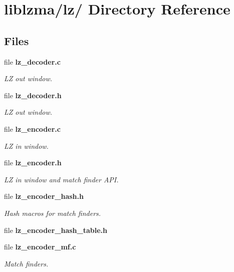 \section{liblzma/lz/ Directory Reference}
\label{dir_50b86e5c919915733207984a4aa1052b}
\subsection*{Files}
\begin{DoxyCompactItemize}
\item 
file {\bf lz\-\_\-decoder.\-c}
\begin{DoxyCompactList}\small\item\em L\-Z out window. \end{DoxyCompactList}\item 
file {\bf lz\-\_\-decoder.\-h}
\begin{DoxyCompactList}\small\item\em L\-Z out window. \end{DoxyCompactList}\item 
file {\bf lz\-\_\-encoder.\-c}
\begin{DoxyCompactList}\small\item\em L\-Z in window. \end{DoxyCompactList}\item 
file {\bf lz\-\_\-encoder.\-h}
\begin{DoxyCompactList}\small\item\em L\-Z in window and match finder A\-P\-I. \end{DoxyCompactList}\item 
file {\bf lz\-\_\-encoder\-\_\-hash.\-h}
\begin{DoxyCompactList}\small\item\em Hash macros for match finders. \end{DoxyCompactList}\item 
file {\bfseries lz\-\_\-encoder\-\_\-hash\-\_\-table.\-h}
\item 
file {\bf lz\-\_\-encoder\-\_\-mf.\-c}
\begin{DoxyCompactList}\small\item\em Match finders. \end{DoxyCompactList}\end{DoxyCompactItemize}
